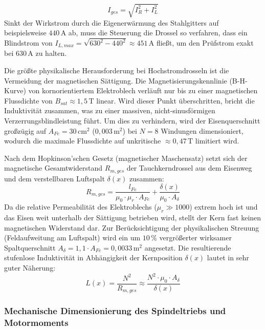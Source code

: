 \begin{equation}
    I_{ges} = \sqrt{I_R^2 + I_L^2}
\end{equation}
Sinkt der Wirkstrom durch die Eigenerwärmung des Stahlgitters auf beispielsweise $440\,\text{A}$ ab, muss die Steuerung die Drossel so verfahren, dass ein Blindstrom von $I_{L,max} = \sqrt{630^2 - 440^2} \approx 451\,\text{A}$ fließt, um den Prüfstrom exakt bei 630\,A zu halten.

Die größte physikalische Herausforderung bei Hochstromdrosseln ist die Vermeidung der magnetischen Sättigung. Die Magnetisierungskennlinie (B-H-Kurve) von kornorientiertem Elektroblech verläuft nur bis zu einer magnetischen Flussdichte von $B_{sat} \approx 1,5\,\text{T}$ linear. Wird dieser Punkt überschritten, bricht die Induktivität zusammen, was zu einer massiven, nicht-sinusförmigen Verzerrungsblindleistung führt. Um dies zu verhindern, wird der Eisenquerschnitt großzügig auf $A_{Fe} = 30\,\text{cm}^2$ ($0,003\,\text{m}^2$) bei $N=8$ Windungen dimensioniert, wodurch die maximale Flussdichte auf unkritische $\approx 0,47\,\text{T}$ limitiert wird.

Nach dem Hopkinson'schen Gesetz (magnetischer Maschensatz) setzt sich der magnetische Gesamtwiderstand $R_{m,ges}$ der Tauchkerndrossel aus dem Eisenweg und dem verstellbaren Luftspalt $\delta(x)$ zusammen:
\begin{equation}
    R_{m,ges} = \frac{l_{Fe}}{\mu_0 \cdot \mu_r \cdot A_{Fe}} + \frac{\delta(x)}{\mu_0 \cdot A_{\delta}}
\end{equation}
Da die relative Permeabilität des Elektroblechs ($\mu_r \gg 1000$) extrem hoch ist und das Eisen weit unterhalb der Sättigung betrieben wird, stellt der Kern fast keinen magnetischen Widerstand dar. Zur Berücksichtigung der physikalischen Streuung (Feldaufweitung am Luftspalt) wird ein um $10\,\%$ vergrößerter wirksamer Spaltquerschnitt $A_\delta = 1,1 \cdot A_{Fe} = 0,0033\,\text{m}^2$ angesetzt. 
Die resultierende stufenlose Induktivität in Abhängigkeit der Kernposition $\delta(x)$ lautet in sehr guter Näherung:
\begin{equation}
    L(x) = \frac{N^2}{R_{m,ges}} \approx \frac{N^2 \cdot \mu_0 \cdot A_{\delta}}{\delta(x)}
\end{equation}
\subsubsection{Mechanische Dimensionierung des Spindeltriebs und Motormoments}
\label{sec:mechanik_spindel}

